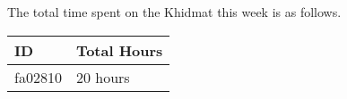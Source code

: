 \documentclass{article}
\begin{document}
The total time spent on the Khidmat this week is as follows. \newline

\begin{tabular}{|l|l|}
  \hline
  ID & Total Hours\\\hline\hline
  fa02810 & 20 hours\\\hline
\end{tabular}










\end{document}
